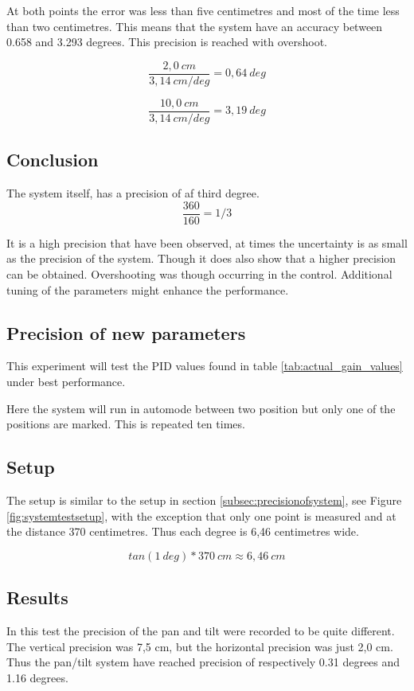 At both points the error was less than five centimetres and most of the time
less than two centimetres. This means that the system have an accuracy between 0.658 and
3.293 degrees. This precision is reached with overshoot.

\[ \frac{2,0 \ cm}{3,14\ cm/deg} = 0,64 \ deg \]

\[ \frac{10,0 \ cm}{3,14 \ cm/deg} = 3,19 \ deg \]

\subsection*{Conclusion}

The system itself, has a precision of af third degree.
\[ \frac{360}{160} = 1/3 \]

It is a high precision that have been observed, at times the uncertainty is as
small as the precision of the system. Though it does also show that a higher
precision can be obtained. Overshooting was though occurring in the control.
Additional tuning of the parameters might enhance the performance.

\subsection{Precision of new parameters}\label{sec:precisionofsystem2}

This experiment will test the PID values found in table \ref{tab:actual_gain_values}
under best performance.

Here the system will run in automode between two position but only one of the
positions are marked. This is repeated ten times.

\subsection*{Setup}

The setup is similar to the setup in section \ref{subsec:precisionofsystem}, see
Figure \ref{fig:systemtestsetup}, with the exception that only one point is measured and at
the distance 370 centimetres. Thus each degree is 6,46 centimetres wide.

\[ tan(1 \ deg) * 370 \ cm \approx 6,46 \ cm \]

\subsection*{Results}

In this test the precision of the pan and tilt were recorded to be quite
different. The vertical precision was 7,5 cm, but the horizontal precision was just 2,0 cm. Thus the pan/tilt system have
reached precision of respectively 0.31 degrees and 1.16 degrees.


